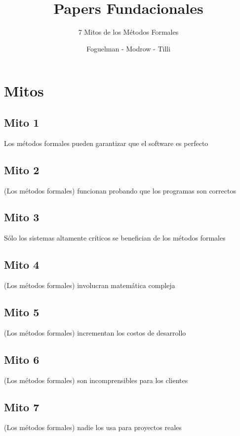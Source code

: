 \documentclass{beamer}
\title{Papers Fundacionales}
\subtitle{7 Mitos de los Métodos Formales}
\author{Foguelman - Modrow - Tilli}
\institute{DC - UBA}
\begin{document}
\frame{\titlepage}

\section{Mitos}
\subsection{Mito 1}
\begin{frame}
Los m\'etodos formales pueden garantizar que el software es perfecto 
\end{frame}

\subsection{Mito 2}
\begin{frame}
(Los m\'etodos formales) funcionan probando que los programas son correctos
\end{frame}

\subsection{Mito 3}
\begin{frame}
S\'olo los sistemas altamente cr\'iticos se benefician de los m\'etodos formales
\end{frame}

\subsection{Mito 4}
\begin{frame}
(Los m\'etodos formales) involucran matem\'atica compleja
\end{frame}

\subsection{Mito 5}
\begin{frame}
(Los m\'etodos formales) incrementan los costos de desarrollo
\end{frame}

\subsection{Mito 6}
\begin{frame}
(Los m\'etodos formales) son incomprensibles para los clientes
\end{frame}

\subsection{Mito 7}
\begin{frame}
(Los m\'etodos formales) nadie los usa para proyectos reales
\end{frame}
\end{document}

